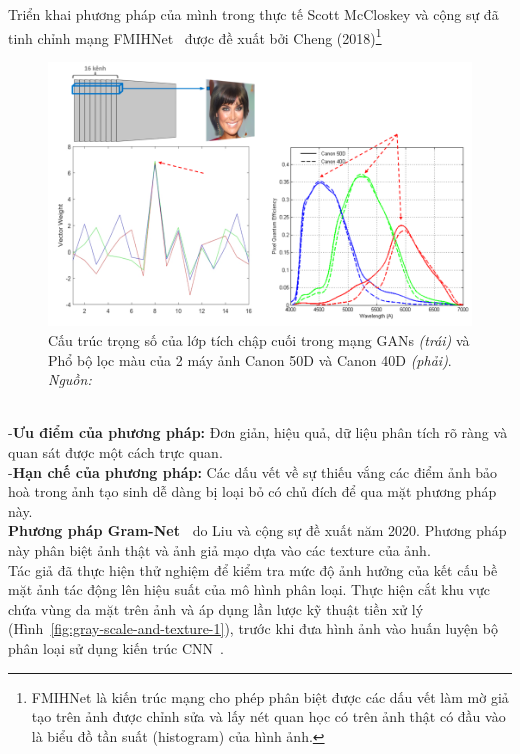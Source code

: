 %
Triển khai phương pháp của mình trong thực tế Scott McCloskey và cộng sự đã tinh chỉnh mạng FMIHNet~\cite{Chen2018FocusMD} được đề xuất bởi Cheng (2018)\footnote{FMIHNet là kiến trúc mạng cho phép phân biệt được các dấu vết làm mờ giả tạo trên ảnh được chỉnh sửa và lấy nét quan học có trên ảnh thật có đầu vào là biểu đồ tần suất (\gls{histogram}) của hình ảnh.}
%
\begin{figure}[h]
	\centering
	\includegraphics[width=0.9\linewidth]{Images/colors-weight-gan-camera-1b.png}
	\begin{minipage}{0.9\linewidth}
		\caption{Cấu trúc trọng số của lớp tích chập cuối trong mạng GANs  \textit{(trái)} và Phổ bộ lọc màu của 2 máy ảnh Canon 50D và Canon 40D \textit{(phải)}. \textit{Nguồn: \cite{8803661}}}
		\label{fig:colors-weight-gan-camera-1b}
	\end{minipage}
\end{figure}\\
%
-\textbf{Ưu điểm của phương pháp:} Đơn giản, hiệu quả, dữ liệu phân tích rõ ràng và quan sát được một cách trực quan.\\
-\textbf{Hạn chế của phương pháp:} Các dấu vết về sự thiếu vắng các điểm ảnh bảo hoà trong ảnh tạo sinh dễ dàng bị loại bỏ có chủ đích để qua mặt phương pháp này.\\
%
\textbf{Phương pháp Gram-Net~\cite{9157447}} do Liu và cộng sự đề xuất năm 2020. Phương pháp này phân biệt ảnh thật và ảnh giả mạo dựa vào các \gls{texture} của ảnh.\\
%
Tác giả đã thực hiện thử nghiệm để kiểm tra mức độ ảnh hưởng của kết cấu bề mặt ảnh tác động lên hiệu suất của mô hình phân loại. Thực hiện cắt khu vực chứa vùng da mặt trên ảnh và áp dụng lần lược kỹ thuật tiền xử lý (Hình~\ref{fig:gray-scale-and-texture-1}), trước khi đưa hình ảnh vào huấn luyện bộ phân loại sử dụng kiến trúc CNN~\cite{Krizhevsky2012ImageNetCW}.
